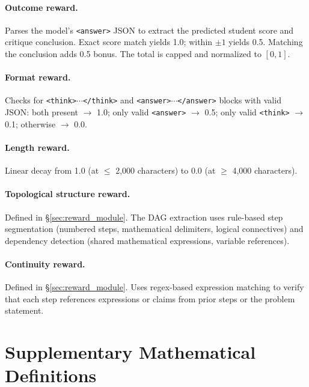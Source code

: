     \paragraph{Outcome reward.}
    Parses the model's \texttt{<answer>} JSON to extract the predicted
    student score and critique conclusion. Exact score match yields 1.0;
    within $\pm 1$ yields 0.5. Matching the conclusion adds 0.5 bonus.
    The total is capped and normalized to $[0, 1]$.
    
    \paragraph{Format reward.}
    Checks for \texttt{<think>$\cdots$</think>} and
    \texttt{<answer>$\cdots$</answer>} blocks with valid JSON:
    both present $\to$ 1.0; only valid \texttt{<answer>} $\to$ 0.5; only valid \texttt{<think>} $\to$ 0.1; otherwise $\to$ 0.0.
    
    \paragraph{Length reward.}
    Linear decay from 1.0 (at $\leq$ 2{,}000 characters) to 0.0 (at
    $\geq$ 4{,}000 characters).
    
    \paragraph{Topological structure reward.}
    Defined in \S\ref{sec:reward_module}. The DAG extraction uses rule-based step
    segmentation (numbered steps, mathematical delimiters, logical
    connectives) and dependency detection (shared mathematical expressions,
    variable references).
    
    \paragraph{Continuity reward.}
    Defined in \S\ref{sec:reward_module}. Uses regex-based expression matching
    to verify that each step references expressions or claims from prior
    steps or the problem statement.
    
    \section{Supplementary Mathematical Definitions}
    \label{app:math_details}
    
